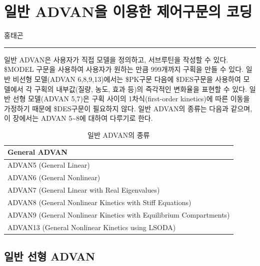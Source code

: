 \documentclass[
  11pt,
  krantz2, a4paper, twoside]{krantz}
\theoremstyle{definition}
\theoremstyle{definition}
\theoremstyle{definition}
\theoremstyle{remark}
\begin{document}
\normalsize

\hypertarget{general-advan}{%
\chapter{일반 ADVAN을 이용한 제어구문의 코딩}\label{general-advan}}

\Large\hfill

홍태곤
\normalsize

\begin{center}\rule{0.5\linewidth}{0.5pt}\end{center}

일반 ADVAN은 사용자가 직접 모델을 정의하고, 서브루틴을 작성할 수 있다. \$MODEL 구문을 사용하여 사용자가 원하는 만큼 999개까지 구획을 만들 수 있다. 일반 비선형 모델(ADVAN 6,8,9,13)에서는 \$PK구문 다음에 \$DES구문을 사용하여 모델에서 각 구획의 내부값(질량, 농도, 효과 등)의 즉각적인 변화율을 표현할 수 있다. 일반 선형 모델(ADVAN 5,7)은 구획 사이의 1차식(first-order kinetics)에 따른 이동을 가정하기 때문에 \$DES구문이 필요하지 않다. 일반 ADVAN의 종류는 다음과 같으며, 이 장에서는 ADVAN 5\textasciitilde8에 대하여 다루기로 한다.

\begin{table}

\caption{\label{tab:gen-advan}일반 ADVAN의 종류}
\centering
\begin{tabular}[t]{l}
\toprule
General ADVAN\\
\midrule
ADVAN5 (General Linear)\\
ADVAN6 (General Nonlinear)\\
ADVAN7 (General Linear with Real Eigenvalues)\\
ADVAN8 (General Nonlinear Kinetics with Stiff Equations)\\
ADVAN9 (General Nonlinear Kinetics with Equilibrium Compartments)\\
\addlinespace
ADVAN13 (General Nonlinear Kinetics using LSODA)\\
\bottomrule
\end{tabular}
\end{table}

\hypertarget{uxc77cuxbc18-uxc120uxd615-advan}{%
\section{일반 선형 ADVAN}\label{uxc77cuxbc18-uxc120uxd615-advan}}
\end{document}
